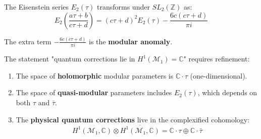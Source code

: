 \begin{definition}\label{def:quasi-modular}
The Eisenstein series $E_2(\tau)$ transforms under $SL_2(\mathbb{Z})$ as:
$$E_2\left(\frac{a\tau + b}{c\tau + d}\right) = (c\tau + d)^2 E_2(\tau) 
- \frac{6c(c\tau + d)}{\pi i}$$

The extra term $-\frac{6c(c\tau + d)}{\pi i}$ is the \textbf{modular anomaly}.
\end{definition}

\begin{theorem}\label{thm:quantum-modular-refined}
The statement "quantum corrections lie in $H^1(\mathcal{M}_1) = \mathbb{C}$" requires 
refinement:

\begin{enumerate}
\item The space of \textbf{holomorphic} modular parameters is $\mathbb{C} \cdot \tau$ 
(one-dimensional).

\item The space of \textbf{quasi-modular} parameters includes $E_2(\tau)$, which 
depends on both $\tau$ and $\bar{\tau}$.

\item The \textbf{physical quantum corrections} live in the complexified cohomology:
$$H^1(\mathcal{M}_1, \mathbb{C}) \otimes \overline{H^1(\mathcal{M}_1, \mathbb{C})} 
= \mathbb{C} \cdot \tau \oplus \mathbb{C} \cdot \bar{\tau}$$
\end{enumerate}
\end{theorem}

